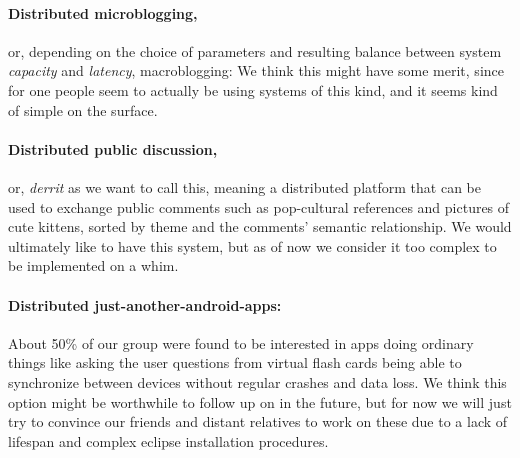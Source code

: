 \documentclass[12pt,a4paper,notitlepage]{article}
\begin{document}
\paragraph{Distributed microblogging,} or, depending on the choice of parameters and resulting balance between system
\emph{capacity} and \emph{latency}, macroblogging: We think this might have some merit, since for one people seem to
actually be using systems of this kind, and it seems kind of simple on the surface.

\paragraph{Distributed public discussion,} or, \emph{derrit} as we want to call this, meaning a distributed platform
that can be used to exchange public comments such as pop-cultural references and pictures of cute kittens, sorted by
theme and the comments' semantic relationship. We would ultimately like to have this system, but as of now we consider
it too complex to be implemented on a whim.

\paragraph{Distributed just-another-android-apps:} About 50\% of our group were found to be interested in apps
doing ordinary things like asking the user questions from virtual flash cards being able to synchronize between devices
without regular crashes and data loss. We think this option might be worthwhile to follow up on in the future, but for
now we will just try to convince our friends and distant relatives to work on these due to a lack of lifespan and
complex eclipse installation procedures.


\nocite{*}

\end{document}
